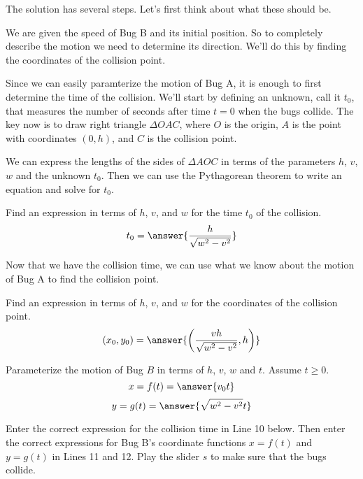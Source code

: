 \documentclass{ximera}
\begin{document}
\begin{explanation}
The solution has several steps. Let's first think about what these should be.

We are given the speed of Bug B and its initial position. So to completely describe the motion we need to determine its direction. We'll do this by finding the coordinates of the collision point. 

Since we can easily paramterize the motion of Bug A, it is enough to first determine the time of the collision. We'll start by defining an unknown, call it $t_0$, that measures the number of seconds after time $t=0$ when the bugs collide. The key now is to draw right triangle $\Delta OAC$, where $O$ is the origin, $A$ is the point with coordinates $(0,h)$, and $C$ is the collision point. 

We can express the lengths of the sides of $\Delta AOC$ in terms of the parameters $h$, $v$, $w$ and the unknown $t_0$. Then we can use the Pythagorean theorem to write an equation and solve for $t_0$.

\begin{question}
 Find an expression in terms of $h$, $v$, and $w$ for the time $t_0$ of the collision.  
\[
        t_0   =  \answer{\frac{h}{\sqrt{w^2-v^2}}}
\]
    \end{question}

Now that we have the collision time, we can use what we know about the motion of Bug A to find the collision point.

\begin{question}
 Find an expression in terms of $h$, $v$, and $w$ for the coordinates of the collision point.  
\[
       (x_0, y_0)  =  \answer{\left( \frac{vh}{\sqrt{w^2-v^2}},h \right)}
\]
    \end{question}


\begin{question}
Parameterize the motion of Bug $B$ in terms of $h$, $v$, $w$ and $t$. Assume $t\geq 0$.
\[
        x = f(t)   =  \answer{v_0 t}
\]
\[
      y = g(t) = \answer{\sqrt{w^2-v^2}t}
\]
    \end{question}

\begin{exploration}\label{exp:pc1c}
Enter the correct expression for the collision time in Line 10 below. Then enter the correct expressions for Bug B's coordinate functions $x=f(t)$ and $y=g(t)$ in Lines 11 and 12. Play the slider $s$ to make sure that the bugs collide.

 
\begin{onlineOnly}
    \begin{center}
\end{center}
\end{onlineOnly}
\end{exploration}

\end{explanation}
\end{document}
